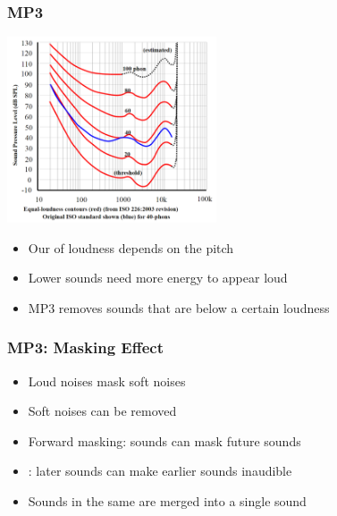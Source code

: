 \begin{frame}
  \frametitle{MP3}
  \begin{center}
    \includegraphics[height=5.5cm]{isophones.png}
  \end{center}
  \begin{itemize}
    \item Our  of loudness depends on the pitch
    \item Lower sounds need more energy to appear loud
    \item MP3 removes sounds that are below a certain loudness
  \end{itemize}
\end{frame}

\begin{frame}
  \frametitle{MP3: Masking Effect}
  \begin{itemize}
    \item Loud noises mask soft noises
    \item Soft noises can be removed
    \item Forward masking: sounds can mask future sounds
    \item {}: later sounds can make earlier sounds inaudible
    \item Sounds in the same  are merged into a single sound
  \end{itemize}
\end{frame}

